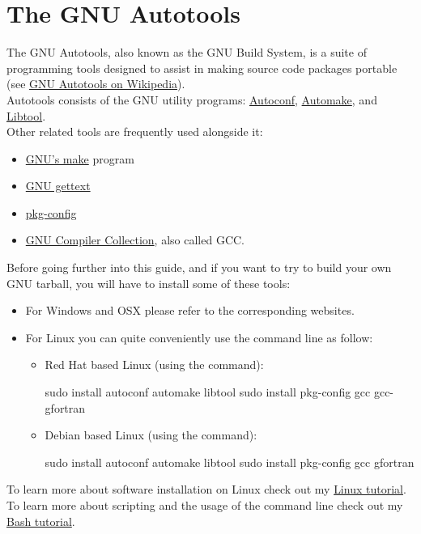 \section{The GNU Autotools}

The GNU Autotools, also known as the GNU Build System, is a suite of programming tools designed to assist in making source code packages portable (see \href{https://en.wikipedia.org/wiki/GNU\_Autotools}{GNU Autotools on Wikipedia}).  \\[0.25cm]
Autotools consists of the GNU utility programs: \href{https://www.gnu.org/software/autoconf/}{Autoconf}, 
\href{https://www.gnu.org/software/automake/}{Automake}, and \href{https://www.gnu.org/software/libtool}{Libtool}. \\
Other related tools are frequently used alongside it: 
\begin{itemize}
\item \href{https://www.gnu.org/software/make/}{GNU's make} program
\item \href{https://www.gnu.org/software/gettext/}{GNU gettext}
\item \href{https://en.wikipedia.org/wiki/Pkg-config}{pkg-config}
\item \href{https://www.gnu.org/software/gcc/}{GNU Compiler Collection}, also called GCC. 
\end{itemize}
Before going further into this guide, and if you want to try to build your own GNU tarball, you will have to install some of these tools: 
\begin{itemize}
\item For Windows and OSX please refer to the corresponding websites.
\item For Linux you can quite conveniently use the command line as follow:
\begin{itemize}
\item Red Hat based Linux (using the  command):
\begin{scriptii}
\fprompt{~} sudo  install autoconf automake libtool
\fprompt{~} sudo  install pkg-config gcc gcc-gfortran
\end{scriptii}
\item Debian based Linux (using the  command):
\begin{scriptii}
\uprompt{~} sudo  install autoconf automake libtool
\uprompt{~} sudo  install pkg-config gcc gfortran
\end{scriptii}
\end{itemize}
\end{itemize}
To learn more about software installation on Linux check out my \href{https://www.ipcms.fr/wp-content/uploads/2021/11/linux.pdf}{Linux tutorial}. \\
To learn more about scripting and the usage of the command line check out my \href{https://www.ipcms.fr/wp-content/uploads/2021/05/bash.pdf}{Bash tutorial}.
\clearpage

